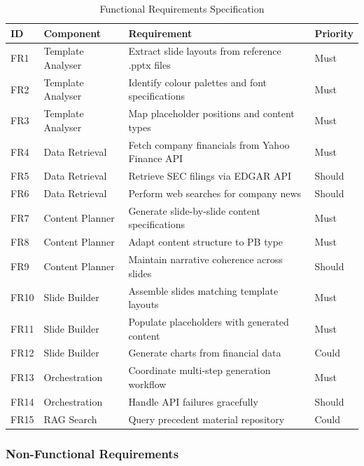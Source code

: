 \begin{table}[H]
\centering
\begin{tabular}{|l|l|l|l|}
\hline
\rowcolor{gray!20} \textbf{ID} & \textbf{Component} & \textbf{Requirement} & \textbf{Priority} \\
\hline
FR1 & Template Analyser & Extract slide layouts from reference .pptx files & Must \\
\hline
FR2 & Template Analyser & Identify colour palettes and font specifications & Must \\
\hline
FR3 & Template Analyser & Map placeholder positions and content types & Must \\
\hline
FR4 & Data Retrieval & Fetch company financials from Yahoo Finance API & Must \\
\hline
FR5 & Data Retrieval & Retrieve SEC filings via EDGAR API & Should \\
\hline
FR6 & Data Retrieval & Perform web searches for company news & Should \\
\hline
FR7 & Content Planner & Generate slide-by-slide content specifications & Must \\
\hline
FR8 & Content Planner & Adapt content structure to PB type & Must \\
\hline
FR9 & Content Planner & Maintain narrative coherence across slides & Should \\
\hline
FR10 & Slide Builder & Assemble slides matching template layouts & Must \\
\hline
FR11 & Slide Builder & Populate placeholders with generated content & Must \\
\hline
FR12 & Slide Builder & Generate charts from financial data & Could \\
\hline
FR13 & Orchestration & Coordinate multi-step generation workflow & Must \\
\hline
FR14 & Orchestration & Handle API failures gracefully & Should \\
\hline
FR15 & RAG Search & Query precedent material repository & Could \\
\hline
\end{tabular}
\caption{Functional Requirements Specification}
\label{tab:func-req}
\end{table}

\subsubsection{Non-Functional Requirements}

